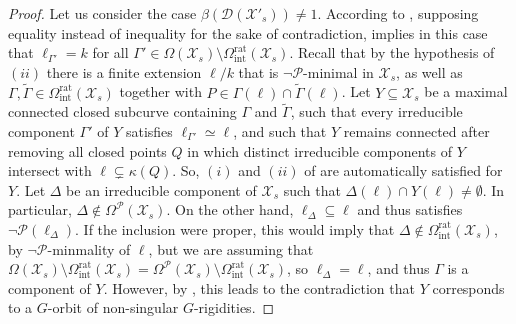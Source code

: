 \documentclass[a4paper,12pt,reqno]{amsart}
\newcommand\mc\mathcal
\theoremstyle{definition}
\numberwithin{equation}{thm}
\begin{document}
\begin{proof}
    Let us consider the case  $\beta(\mc{D}(\mathcal{X}'_s)) \neq 1$. According to , supposing equality instead of inequality for the sake of contradiction, implies in this case  that $\ell_{\Gamma'} = k$ for all $\Gamma' \in \Omega(\mc{X}_s) \setminus \Omega^\mathrm{rat}_{\mathrm{int}}(\mc{X}_s)$.
    Recall that by the hypothesis of $(ii)$ 
  there is a finite extension $\ell/k$ that is $\neg\mathcal{P}$-minimal in $\mc{X}_s$, as well as $\Gamma, \widetilde{\Gamma} \in \Omega^{\mathrm{rat}}_{\mathrm{int}}(\mc{X}_s)$ together with 
$P \in \Gamma(\ell) \cap \widetilde{\Gamma}(\ell)$.
Let $Y \subseteq \mc{X}_s$ be a maximal connected closed subcurve containing $\Gamma$ and $\widetilde{\Gamma}$, such that every irreducible component $\Gamma'$ of $Y$ satisfies $\ell_{\Gamma'}\simeq \ell$, and such that $Y$ remains connected after removing all closed points $Q$ in which distinct irreducible components of $Y$ intersect with $\ell  \subsetneq \kappa(Q)$. So, $(i)$ and $(ii)$ of  are automatically satisfied for $Y$.  Let $\Delta$ be an irreducible component of $\mc{X}_s$ such that $\Delta(\ell) \cap Y(\ell) \neq \emptyset$. In particular, $\Delta \notin \Omega^{\mathcal{P}}(\mc{X}_s)$. On the other hand, $\ell_\Delta \subseteq \ell$ and thus satisfies $\neg\mathcal{P}(\ell_\Delta)$. If the inclusion were proper, this would imply that $\Delta \notin \Omega^\mathrm{rat}_{\mathrm{int}}(\mc{X}_s)$, by $\neg\mathcal{P}$-minmality of $\ell$, but we are assuming that  $ \Omega(\mc{X}_s) \setminus \Omega^\mathrm{rat}_{\mathrm{int}}(\mc{X}_s)  =  \Omega^{ \mathcal{P}}(\mc{X}_s) \setminus \Omega^\mathrm{rat}_{\mathrm{int}}(\mc{X}_s)$, so  $\ell_\Delta = \ell$, and thus $\Gamma$ is a component of $Y$. However, by , this leads to the contradiction that $Y$ corresponds to a $G$-orbit of non-singular $G$-rigidities.


\end{proof}
\end{document}
